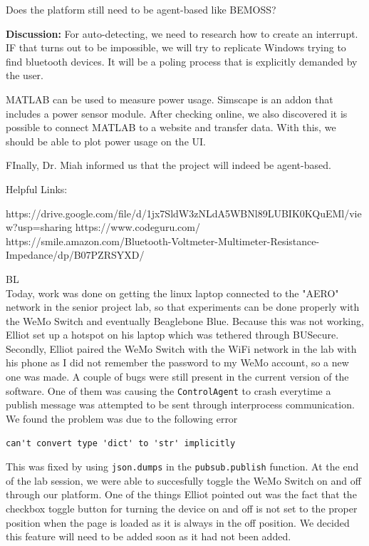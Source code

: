 \documentclass[fontsize=11pt, %
                             paper=letter, %
                             openany, %
                             captions=tableheading,
                             index=totoc,
                             hyperref]{labbook}
\begin{document}
Does the platform still need to be agent-based like BEMOSS? 

\textbf{Discussion:} For auto-detecting, we need to research how to create an
interrupt. IF that turns out to be impossible, we will try to replicate Windows
trying to find bluetooth devices. It will be a poling process that is explicitly
demanded by the user.

MATLAB can be used to measure power usage. Simscape is an addon that includes a
power sensor module. After checking online, we also discovered it is possible to
connect MATLAB to a website and transfer data. With this, we should be able to
plot power usage on the UI.

FInally, Dr. Miah informed us that the project will indeed be agent-based.

Helpful Links:

https://drive.google.com/file/d/1jx7SldW3zNLdA5WBNl89LUBIK0KQuEMl/view?usp=sharing
https://www.codeguru.com/
https://smile.amazon.com/Bluetooth-Voltmeter-Multimeter-Resistance-Impedance/dp/B07PZRSYXD/


BL\\
Today, work was done on getting the linux laptop connected to the "AERO" network in the senior project lab, so that experiments can be done properly with the WeMo Switch and eventually Beaglebone Blue. Because this was not working, Elliot set up a hotspot on his laptop which was tethered through BUSecure. Secondly, Elliot paired the WeMo Switch with the WiFi network in the lab with his phone as I did not remember the password to my WeMo account, so a new one was made. A couple of bugs were still present in the current version of the software. One of them was causing the \texttt{ControlAgent} to crash everytime a publish message was attempted to be sent through interprocess communication. We found the problem was due to the following error
\begin{Verbatim}
can't convert type 'dict' to 'str' implicitly
\end{Verbatim} 
This was fixed by using \texttt{json.dumps} in the \texttt{pubsub.publish} function. At the end of the lab session, we were able to succesfully toggle the WeMo Switch on and off through our platform. One of the things Elliot pointed out was the fact that the checkbox toggle button for turning the device on and off is not set to the proper position when the page is loaded as it is always in the off position. We decided this feature will need to be added soon as it had not been added.
\end{document}
